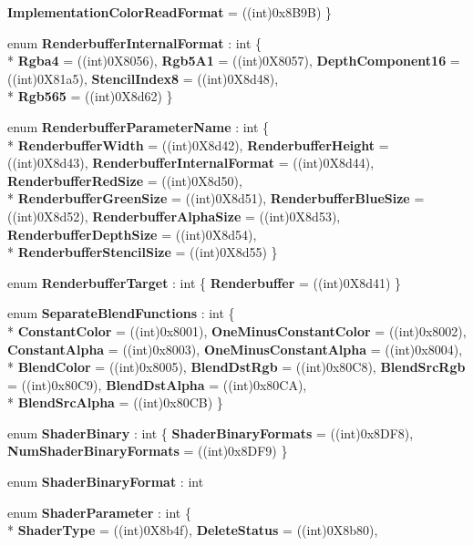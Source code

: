 \begin{DoxyCompactItemize}
{\bfseries Implementation\-Color\-Read\-Format} = ((int)0x8\-B9\-B)
 \}
\item 
enum {\bfseries Renderbuffer\-Internal\-Format} \-: int \{ \\*
{\bfseries Rgba4} = ((int)0\-X8056), 
{\bfseries Rgb5\-A1} = ((int)0\-X8057), 
{\bfseries Depth\-Component16} = ((int)0\-X81a5), 
{\bfseries Stencil\-Index8} = ((int)0\-X8d48), 
\\*
{\bfseries Rgb565} = ((int)0\-X8d62)
 \}
\item 
enum {\bfseries Renderbuffer\-Parameter\-Name} \-: int \{ \\*
{\bfseries Renderbuffer\-Width} = ((int)0\-X8d42), 
{\bfseries Renderbuffer\-Height} = ((int)0\-X8d43), 
{\bfseries Renderbuffer\-Internal\-Format} = ((int)0\-X8d44), 
{\bfseries Renderbuffer\-Red\-Size} = ((int)0\-X8d50), 
\\*
{\bfseries Renderbuffer\-Green\-Size} = ((int)0\-X8d51), 
{\bfseries Renderbuffer\-Blue\-Size} = ((int)0\-X8d52), 
{\bfseries Renderbuffer\-Alpha\-Size} = ((int)0\-X8d53), 
{\bfseries Renderbuffer\-Depth\-Size} = ((int)0\-X8d54), 
\\*
{\bfseries Renderbuffer\-Stencil\-Size} = ((int)0\-X8d55)
 \}
\item 
enum {\bfseries Renderbuffer\-Target} \-: int \{ {\bfseries Renderbuffer} = ((int)0\-X8d41)
 \}
\item 
enum {\bfseries Separate\-Blend\-Functions} \-: int \{ \\*
{\bfseries Constant\-Color} = ((int)0x8001), 
{\bfseries One\-Minus\-Constant\-Color} = ((int)0x8002), 
{\bfseries Constant\-Alpha} = ((int)0x8003), 
{\bfseries One\-Minus\-Constant\-Alpha} = ((int)0x8004), 
\\*
{\bfseries Blend\-Color} = ((int)0x8005), 
{\bfseries Blend\-Dst\-Rgb} = ((int)0x80\-C8), 
{\bfseries Blend\-Src\-Rgb} = ((int)0x80\-C9), 
{\bfseries Blend\-Dst\-Alpha} = ((int)0x80\-C\-A), 
\\*
{\bfseries Blend\-Src\-Alpha} = ((int)0x80\-C\-B)
 \}
\item 
enum {\bfseries Shader\-Binary} \-: int \{ {\bfseries Shader\-Binary\-Formats} = ((int)0x8\-D\-F8), 
{\bfseries Num\-Shader\-Binary\-Formats} = ((int)0x8\-D\-F9)
 \}
\item 
enum {\bfseries Shader\-Binary\-Format} \-: int 
\item 
enum {\bfseries Shader\-Parameter} \-: int \{ \\*
{\bfseries Shader\-Type} = ((int)0\-X8b4f), 
{\bfseries Delete\-Status} = ((int)0\-X8b80), 

\end{DoxyCompactItemize}
